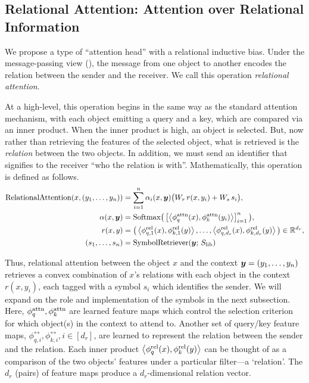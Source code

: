 \subsection{Relational Attention: Attention over Relational Information}

We propose a type of ``attention head'' with a relational inductive bias. Under the message-passing view (), the message from one object to another encodes the relation between the sender and the receiver. We call this operation \textit{relational attention}.

At a high-level, this operation begins in the same way as the standard attention mechanism, with each object emitting a query and a key, which are compared via an inner product. When the inner product is high, an object is selected. But, now rather than retrieving the features of the selected object, what is retrieved is the \textit{relation} between the two objects. In addition, we must send an identifier that signifies to the receiver ``who the relation is with''. Mathematically, this operation is defined as follows.
\begin{equation}\label{eq:rel_attn}
  \begin{split}
    \mathrm{RelationalAttention}(x, (y_1, \ldots, y_n)) &= \sum_{i=1}^{n} \alpha_i(x, \bm{y}) \big(W_r \, r(x, y_i) + W_s \, s_i\big), \\
    \alpha(x, \bm{y}) &= \mathrm{Softmax}\big(\left[\left \langle \phi_q^{\mathrm{attn}}(x), \phi_k^{\mathrm{attn}}(y_i) \right\rangle\right]_{i=1}^{n}\big), \\
    r(x, y) &= \big(\left \langle \phi_{q,1}^{\mathrm{rel}}(x), \phi_{k,1}^{\mathrm{rel}}(y) \right\rangle, \ldots, \left \langle \phi_{q, d_r}^{\mathrm{rel}}(x), \phi_{k, d_r}^{\mathrm{rel}}(y) \right\rangle\big) \in \mathbb{R}^{d_r}, \\
    (s_1, \ldots, s_n) &= \mathrm{SymbolRetriever}(\bm{y};\,S_\mathrm{lib})
  \end{split}
\end{equation}

Thus, relational attention between the object $x$ and the context $\bm{y} = (y_1, \ldots, y_n)$ retrieves a convex combination of $x$'s relations with each object in the context $r(x, y_i)$, each tagged with a symbol $s_i$ which identifies the sender. We will expand on the role and implementation of the symbols in the next subsection. Here, $\phi_q^{\mathrm{attn}}, \phi_k^{\mathrm{attn}}$ are learned feature maps which control the selection criterion for which object(s) in the context to attend to. Another set of query/key feature maps, $\phi_{q,i}^{\rel}, \phi_{k,i}^{\rel}, i \in [d_r]$, are learned to represent the relation between the sender and the relation. Each inner product $\left \langle \phi_q^{\mathrm{rel}}(x), \phi_k^{\mathrm{rel}}(y) \right\rangle$ can be thought of as a comparison of the two objects' features under a particular filter---a `relation'. The $d_r$ (pairs) of feature maps produce a $d_r$-dimensional relation vector.

